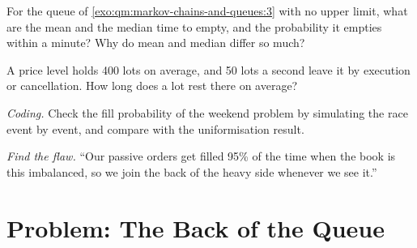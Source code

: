 \begin{exercise}[$\star\star$]\label{exo:qm:markov-chains-and-queues:5}
For the queue of \cref{exo:qm:markov-chains-and-queues:3} with no upper limit, what are the mean and the median
time to empty, and the probability it empties within a minute? Why do mean and median differ so much?
\end{exercise}

\begin{exercise}[$\star\star$]\label{exo:qm:markov-chains-and-queues:6}
A price level holds 400 lots on average, and 50 lots a second leave it by execution or cancellation. How long does
a lot rest there on average?
\end{exercise}

\begin{exercise}[$\star\star\star$]\label{exo:qm:markov-chains-and-queues:7}
\emph{Coding.} Check the fill probability of the weekend problem by simulating the race event by event, and
compare with the uniformisation result.
\end{exercise}

\begin{exercise}[$\star\star\star$]\label{exo:qm:markov-chains-and-queues:8}
\emph{Find the flaw.} ``Our passive orders get filled 95\% of the time when the book is this imbalanced, so we
join the back of the heavy side whenever we see it.''
\end{exercise}

\section{Problem: The Back of the Queue}


